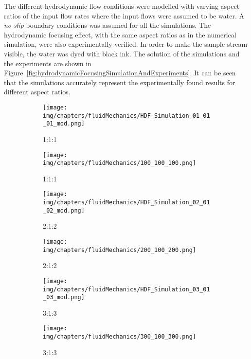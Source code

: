 The different hydrodynamic flow conditions were modelled with varying aspect ratios of the input flow rates where the input flows were assumed to be water. A \textit{no-slip} boundary conditions was assumed for all the simulations. The hydrodynamic focusing effect, with the same aspect ratios as in the numerical simulation, were also experimentally verified. In order to make the sample stream visible, the water was dyed with black ink. The solution of the simulations and the experiments are shown in Figure~\ref{fig:hydrodynamicFocusingSimulationAndExperiments}. It can be seen that the simulations accurately represent the experimentally found results for different aspect ratios. 


\begin{figure}[htb]
        \centering
        \begin{subfigure}[b]{0.4\textwidth}
				\texttt{[image: img/chapters/fluidMechanics/HDF\_Simulation\_01\_01\_01\_mod.png]}
				\caption{1:1:1}
        \end{subfigure}
        \begin{subfigure}[b]{0.4\textwidth}
				\texttt{[image: img/chapters/fluidMechanics/100\_100\_100.png]}
				\caption{1:1:1}
        \end{subfigure}
        \begin{subfigure}[b]{0.4\textwidth}
				\texttt{[image: img/chapters/fluidMechanics/HDF\_Simulation\_02\_01\_02\_mod.png]}
				\caption{2:1:2}
        \end{subfigure}
        \begin{subfigure}[b]{0.4\textwidth}
				\texttt{[image: img/chapters/fluidMechanics/200\_100\_200.png]}
				\caption{2:1:2}
        \end{subfigure}
        \begin{subfigure}[b]{0.4\textwidth}
				\texttt{[image: img/chapters/fluidMechanics/HDF\_Simulation\_03\_01\_03\_mod.png]}
				\caption{3:1:3}
        \end{subfigure}
        \begin{subfigure}[b]{0.4\textwidth}
				\texttt{[image: img/chapters/fluidMechanics/300\_100\_300.png]}
				\caption{3:1:3}
        \end{subfigure}
        \begin{subfigure}[b]{0.4\textwidth}

\end{subfigure}
\end{figure}
